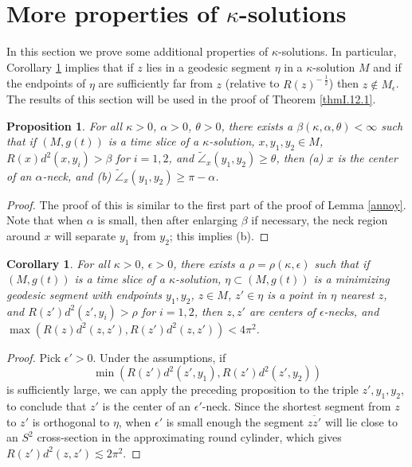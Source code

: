 \documentclass[12pt]{amsart}
\newcommand{\cangle}{\widetilde{\angle}}
\newcommand{\eps}{\epsilon}
\newcommand{\ol}{\overline}
\numberwithin{equation}{section}
\theoremstyle{plain}
\newtheorem{proposition}[equation]{Proposition}
\newtheorem{corollary}[equation]{Corollary}
\theoremstyle{definition}
\theoremstyle{remark}
\begin{document}
\section{More properties of $\kappa$-solutions}

In  this section we prove some additional properties of
$\kappa$-solutions. In particular, Corollary \ref{longsegment} implies
that if 
$z$
lies in a geodesic segment $\eta$ in a $\kappa$-solution $M$
and if the endpoints of $\eta$ are sufficiently far from 
$z$ (relative to $R(z)^{- \: \frac12}$) then $z \notin M_\epsilon$.
The results of this section will be used in the proof of Theorem 
\ref{thmI.12.1}.

\begin{proposition}
\label{neckcrit}
For all $\kappa>0$, $\alpha>0$, $\theta>0$, 
there exists a $\beta(\kappa,\alpha,\theta)<\infty$
such that if $(M,g(t))$ is a time slice of a $\kappa$-solution,
$x,y_1,y_2\in M$, $R(x)d^2(x,y_i)>\beta$ for $i=1,2$, and $\cangle_x(y_1,y_2)\geq \theta$,
then (a) $x$ is the center of
 an $\alpha$-neck, and (b) $\cangle_x(y_1,y_2)\geq \pi-
\alpha$.
\end{proposition}
\begin{proof}
The proof of this is similar to the first part of the proof of
Lemma \ref{annoy}.  Note that when $\alpha$ is small, then after enlarging
$\beta$ if necessary, the neck region around $x$ will separate 
$y_1$ from $y_2$; this implies (b).
\end{proof}

\begin{corollary} \label{longsegment}
For all $\kappa>0$, $\eps>0$, there exists a $\rho=\rho(\kappa,\eps)$ such that
if $(M,g(t))$ is a time slice of a $\kappa$-solution, $\eta\subset (M,g(t))$
is a minimizing geodesic segment with endpoints $y_1,y_2$, $z\in M$, $z'\in \eta$
is a point in $\eta$ nearest $z$, and $R(z')d^2(z',y_i)>\rho$
for $i=1,2$, then
$z,z'$ are centers of 
$\eps$-necks, and $\max(R(z)d^2(z,z'),R(z')d^2(z,z'))<4\pi^2$.
\end{corollary}
\begin{proof}
Pick $\eps'>0$.  Under the assumptions, if 
\begin{equation}
\min(R(z')d^2(z',y_1),R(z')d^2(z',y_2))
\end{equation}
is sufficiently large, we can apply the preceding proposition
to the triple $z',y_1,y_2$, to conclude that $z'$ is the center of an 
$\eps'$-neck.  Since the shortest segment from $z$ to $z'$
is orthogonal to $\eta$, when $\eps'$ is small enough 
the segment $\ol{zz'}$ will lie close to an $S^2$ cross-section
in the approximating round cylinder, which 
gives $R(z')d^2(z,z')\lesssim 2\pi^2$.
\end{proof}
\end{document}

